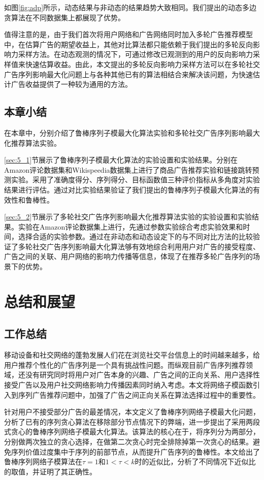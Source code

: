 如图\ref{fig:adp}所示，动态结果与非动态的结果趋势大致相同。我们提出的动态多边贪算法在不同数据集上都展现了优势。

值得注意的是，由于我们首次将用户网络和广告网络同时加入多轮广告推荐模型中，在估算广告的期望收益上，其他对比算法都只能依赖于我们提出的多轮反向影响力采样方法。在动态观测的情况下，可通过修改已观测到的用户的反向影响力采样值来快速估算收益。由此，本文提出的多轮反向影响力采样方法可以在多轮社交广告序列影响最大化问题上与各种其他已有的算法相结合来解决该问题，为快速估计广告收益提供了一种较为通用的方法。


\section{本章小结}

在本章中，分别介绍了鲁棒序列子模最大化算法实验和多轮社交广告序列影响最大化推荐算法实验。

\ref{sec:5_1}节展示了鲁棒序列子模最大化算法的实验设置和实验结果。分别在Amazon评论数据集和Wikispeedia数据集上进行了商品广告推荐实验和链接跳转预测实验。采用了准确度得分、序列得分、目标函数值三种评价指标从多角度对实验结果进行评估。通过对比实验结果验证了我们提出的鲁棒序列子模最大化算法的有效性和鲁棒性。

\ref{sec:5_2}节展示了多轮社交广告序列影响最大化推荐算法实验的实验设置和实验结果。实验在Amazon评论数据集上进行，先通过参数实验综合考虑实验效果和时间，选择合适的实验参数。通过在非动态和动态设定下的与不同对比方法的比较验证了多轮社交广告序列影响最大化算法够有效地综合利用用户对广告的接受程度、广告之间的关联、用户网络的影响力传播等信息，体现了在推荐多轮广告序列的场景下的优势。

\chapter{总结和展望}

\section{工作总结}

移动设备和社交网络的蓬勃发展人们花在浏览社交平台信息上的时间越来越多，给用户推荐个性化的广告序列是一个具有挑战性问题。而纵观目前广告序列推荐领域，还没有研究同时将用户对广告本身的兴趣、广告之间的正向关系、用户选择性接受广告以及用户社交网络影响力传播因素同时纳入考虑。本文将网络子模函数引入到序列广告推荐问题中，加强了广告之间正向关系在算法选择过程中的重要性。

针对用户不接受部分广告的最差情况，本文定义了鲁棒序列网络子模最大化问题，分析了已有的序列贪心算法在移除部分节点情况下的弊端，进一步提出了采用两段式贪心的鲁棒序列网络子模最大化算法。该算法的核心在于，将序列分为两部分，分别做两次独立的贪心选择，在做第二次贪心时完全排除掉第一次贪心的结果。避免序列价值过度集中于序列的前部节点，从而提升广告序列的鲁棒性。本文给出了鲁棒序列网络子模算法在$\tau = 1$和$1 < \tau < k$时的近似比，分析了不同情况下近似比的取值，并证明了其正确性。

